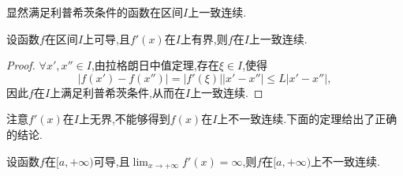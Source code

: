 显然满足利普希茨条件的函数在区间$I$上一致连续.
\begin{theorem}
    设函数$f$在区间$I$上可导,且$f'(x)$在$I$上有界,则$f$在$I$上一致连续.
\end{theorem}
\begin{proof}
    $\forall x',x''\in I$,由拉格朗日中值定理,存在$\xi\in I$,使得
    \begin{equation*}
        |f(x')-f(x'')|=|f'(\xi)||x'-x''|\leq L|x'-x''|,
    \end{equation*}
    因此$f$在$I$上满足利普希茨条件,从而在$I$上一致连续.
\end{proof}
注意$f'(x)$在$I$上无界,不能够得到$f(x)$在$I$上不一致连续.下面的定理给出了正确的结论.
\begin{theorem}
    设函数$f$在$[a,+\infty)$可导,且$\displaystyle\lim_{x\to +\infty} f'(x)=\infty$,则$f$在$[a,+\infty)$上不一致连续.
\end{theorem}